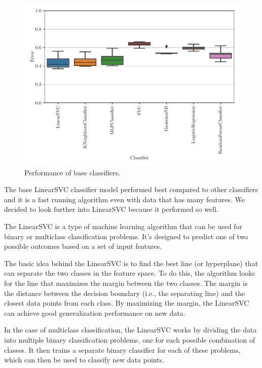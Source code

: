 \begin{figure}[ht]
  \centering
  \includegraphics[width=\scale\textwidth]{../img/plot_explore_classifiers.pdf}
  \caption{Performance of base classifiers.}
  \label{fig:explore_classifiers}
\end{figure} 

The base LinearSVC classifier model performed best compared to other classifiers and it is a fast running algorithm even with data that has many features. We decided to look further into LinearSVC because it performed so well. 

The LinearSVC is a type of machine learning algorithm that can be used for binary or multiclass classification problems. It's designed to predict one of two possible outcomes based on a set of input features. 

The basic idea behind the LinearSVC is to find the best line (or hyperplane) that can separate the two classes in the feature space. To do this, the algorithm looks for the line that maximizes the margin between the two classes. The margin is the distance between the decision boundary (i.e., the separating line) and the closest data points from each class. By maximizing the margin, the LinearSVC can achieve good generalization performance on new data.

In the case of multiclass classification, the LinearSVC works by dividing the data into multiple binary classification problems, one for each possible combination of classes. It then trains a separate binary classifier for each of these problems, which can then be used to classify new data points.

